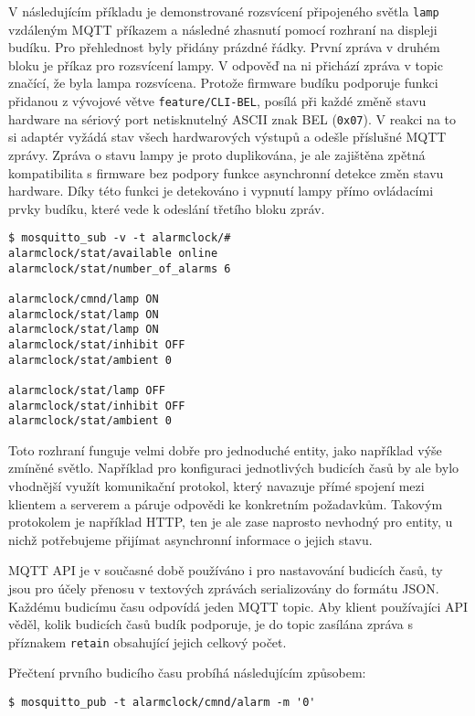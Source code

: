 V následujícím příkladu je demonstrované rozsvícení připojeného světla
\texttt{lamp} vzdáleným MQTT příkazem a následné zhasnutí pomocí rozhraní na
displeji budíku. Pro přehlednost byly přidány prázdné řádky. První zpráva
v druhém bloku je příkaz pro rozsvícení lampy. V odpověď na ni přichází zpráva
v topic  značící, že byla lampa rozsvícena. Protože
firmware budíku podporuje funkci přidanou z vývojové větve
\texttt{feature/CLI-BEL}, posílá při každé změně stavu hardware na sériový port
netisknutelný ASCII znak BEL (\texttt{0x07}). V reakci na to si adaptér vyžádá
stav všech hardwarových výstupů a odešle příslušné MQTT zprávy. Zpráva o stavu
lampy je proto duplikována, je ale zajištěna zpětná kompatibilita s firmware
bez podpory funkce asynchronní detekce změn stavu hardware.
Díky této funkci je detekováno i vypnutí lampy přímo ovládacími prvky budíku,
které vede k odeslání třetího bloku zpráv.
\begin{lstlisting}[style=terminal]
$ mosquitto_sub -v -t alarmclock/#
alarmclock/stat/available online
alarmclock/stat/number_of_alarms 6

alarmclock/cmnd/lamp ON
alarmclock/stat/lamp ON
alarmclock/stat/lamp ON
alarmclock/stat/inhibit OFF
alarmclock/stat/ambient 0

alarmclock/stat/lamp OFF
alarmclock/stat/inhibit OFF
alarmclock/stat/ambient 0
\end{lstlisting}

Toto rozhraní funguje velmi dobře pro jednoduché entity, jako například výše
zmíněné světlo. Například pro konfiguraci jednotlivých budicích časů by ale
bylo vhodnější využít komunikační protokol, který navazuje přímé spojení mezi
klientem a serverem a páruje odpovědi ke konkretním požadavkům. Takovým
protokolem je například HTTP, ten je ale zase naprosto nevhodný pro entity,
u nichž potřebujeme přijímat asynchronní informace o jejich stavu.

MQTT API je v současné době používáno i pro nastavování budicích časů, ty jsou
pro účely přenosu v textových zprávách serializovány do formátu JSON.
Každému budicímu času odpovídá jeden MQTT topic. Aby klient používajíci API
věděl, kolik budicích časů budík podporuje, je do topic
 zasílána zpráva s příznakem
\texttt{retain} obsahující jejich celkový počet.

Přečtení prvního budicího času probíhá následujícím způsobem:
\begin{lstlisting}[style=terminal]
$ mosquitto_pub -t alarmclock/cmnd/alarm -m '0'
\end{lstlisting}

